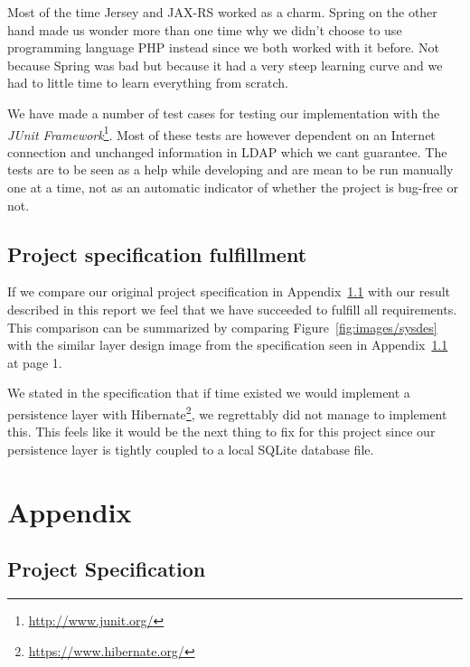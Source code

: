 \documentclass[titlepage, twocolumn, a4paper, 10pt]{article}
\begin{document}
Most of the time Jersey and JAX-RS worked as a charm. Spring on the
other hand made us wonder more than one time why we didn't choose to
use programming language PHP instead since we both worked with it
before. Not because Spring was bad but because it had a very steep
learning curve and we had to little time to learn everything from
scratch.

We have made a number of test cases for testing our implementation
with the \textit{JUnit
  Framework}\footnote{\url{http://www.junit.org/}}. Most of these
tests are however dependent on an Internet connection and unchanged
information in LDAP which we cant guarantee. The tests are to be seen
as a help while developing and are mean to be run manually one at a
time, not as an automatic indicator of whether the project is bug-free
or not.

\subsection{Project specification fulfillment}
If we compare our original project specification in
Appendix~\ref{app:ps} with our result described in this report we feel
that we have succeeded to fulfill all requirements. This comparison
can be summarized by comparing Figure~\vref{fig:images/sysdes} with
the similar layer design image from the specification seen in
Appendix~\ref{app:ps} at page 1.

We stated in the specification that if time existed we would implement
a persistence layer with
Hibernate\footnote{\url{https://www.hibernate.org/}}, we regrettably did not
manage to implement this. This feels like it would be the next thing
to fix for this project since our persistence layer is tightly coupled
to a local SQLite database file.
% 
% 

\newpage
\onecolumn
\appendix
{}
\section{Appendix}\label{sec:app}
\subsection{Project Specification}\label{app:ps}
\newpage
\end{document}
